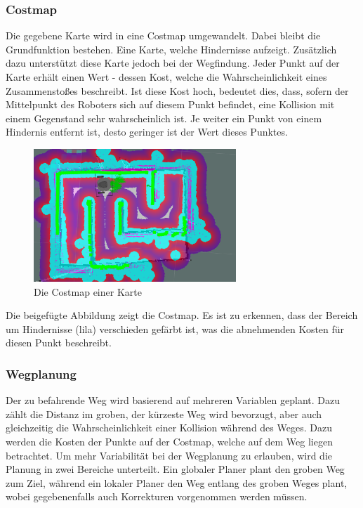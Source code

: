{{{{			\subsubsection{Costmap}
			{
				Die gegebene Karte wird in eine Costmap umgewandelt. Dabei bleibt die Grundfunktion bestehen. Eine Karte, welche Hindernisse aufzeigt. Zusätzlich dazu unterstützt diese Karte jedoch bei der Wegfindung. Jeder Punkt auf der Karte erhält einen Wert - dessen Kost, welche die Wahrscheinlichkeit eines Zusammenstoßes beschreibt. Ist diese Kost hoch, bedeutet dies, dass, sofern der Mittelpunkt des Roboters sich auf diesem Punkt befindet, eine Kollision mit einem Gegenstand sehr wahrscheinlich ist. Je weiter ein Punkt von einem Hindernis entfernt ist, desto geringer ist der Wert dieses Punktes. 
				\begin{figure}[H]
					\centering				\includegraphics[height=5cm]{Bilder/costmap_overlayed.png}
					\caption{Die Costmap einer Karte} 
					\label{pic:costmapoverlayed}
				\end{figure}
				Die beigefügte Abbildung zeigt die Costmap. Es ist zu erkennen, dass der Bereich um Hindernisse (lila) verschieden gefärbt ist, was die abnehmenden Kosten für diesen Punkt beschreibt.
			}
			
			\subsubsection{Wegplanung}
			{
				Der zu befahrende Weg wird basierend auf mehreren Variablen geplant. Dazu zählt die Distanz im groben, \dahe der kürzeste Weg wird bevorzugt, aber auch gleichzeitig die Wahrscheinlichkeit einer Kollision während des Weges. Dazu werden die Kosten der Punkte auf der Costmap, welche auf dem Weg liegen betrachtet. Um mehr Variabilität bei der Wegplanung zu erlauben, wird die Planung in zwei Bereiche unterteilt. Ein globaler Planer plant den groben Weg zum Ziel, während ein lokaler Planer den Weg entlang des groben Weges plant, wobei gegebenenfalls auch Korrekturen vorgenommen werden müssen.
				
}}}}}
